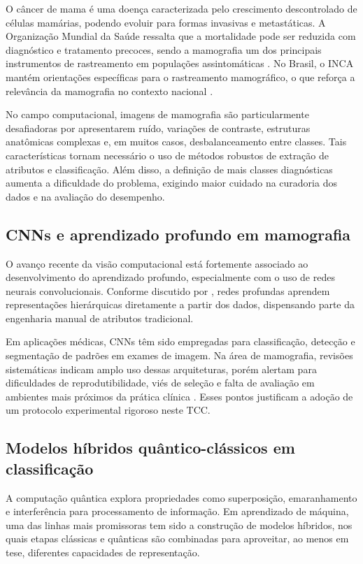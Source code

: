 \documentclass[
    12pt,
    openright,
    oneside,
    a4paper,
    english,
    brazil
]{abntex2}
\begin{document}
O câncer de mama é uma doença caracterizada pelo crescimento descontrolado de células mamárias, podendo evoluir para formas invasivas e metastáticas. A Organização Mundial da Saúde ressalta que a mortalidade pode ser reduzida com diagnóstico e tratamento precoces, sendo a mamografia um dos principais instrumentos de rastreamento em populações assintomáticas \cite{WHO2026BreastCancer}. No Brasil, o INCA mantém orientações específicas para o rastreamento mamográfico, o que reforça a relevância da mamografia no contexto nacional \cite{INCA2025Rastreamento}.

No campo computacional, imagens de mamografia são particularmente desafiadoras por apresentarem ruído, variações de contraste, estruturas anatômicas complexas e, em muitos casos, desbalanceamento entre classes. Tais características tornam necessário o uso de métodos robustos de extração de atributos e classificação. Além disso, a definição de mais classes diagnósticas aumenta a dificuldade do problema, exigindo maior cuidado na curadoria dos dados e na avaliação do desempenho.

\subsection{CNNs e aprendizado profundo em mamografia}

O avanço recente da visão computacional está fortemente associado ao desenvolvimento do aprendizado profundo, especialmente com o uso de redes neurais convolucionais. Conforme discutido por , redes profundas aprendem representações hierárquicas diretamente a partir dos dados, dispensando parte da engenharia manual de atributos tradicional.

Em aplicações médicas, CNNs têm sido empregadas para classificação, detecção e segmentação de padrões em exames de imagem. Na área de mamografia, revisões sistemáticas indicam amplo uso dessas arquiteturas, porém alertam para dificuldades de reprodutibilidade, viés de seleção e falta de avaliação em ambientes mais próximos da prática clínica \cite{Bhalla2023MammographyReview}. Esses pontos justificam a adoção de um protocolo experimental rigoroso neste TCC.

\subsection{Modelos híbridos quântico-clássicos em classificação}

A computação quântica explora propriedades como superposição, emaranhamento e interferência para processamento de informação. Em aprendizado de máquina, uma das linhas mais promissoras tem sido a construção de modelos híbridos, nos quais etapas clássicas e quânticas são combinadas para aproveitar, ao menos em tese, diferentes capacidades de representação.
\end{document}
